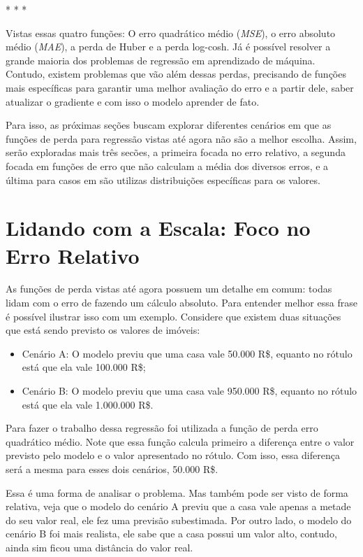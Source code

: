 \medskip
\begin{center}
 * * *
\end{center}
\medskip

Vistas essas quatro funções: O erro quadrático médio (\textit{MSE}), o erro absoluto médio (\textit{MAE}), a perda de Huber e a perda log-cosh. Já é possível resolver a grande maioria dos problemas de regressão em aprendizado de máquina. Contudo, existem problemas que vão além dessas perdas, precisando de funções mais específicas para garantir uma melhor avaliação do erro e a partir dele, saber atualizar o gradiente e com isso o modelo aprender de fato.

Para isso, as próximas seções buscam explorar diferentes cenários em que as funções de perda para regressão vistas até agora não são a melhor escolha. Assim, serão exploradas mais três secões, a primeira focada no erro relativo, a segunda focada em funções de erro que não calculam a média dos diversos erros, e a última para casos em são utilizas distribuições específicas para os valores.

\section{Lidando com a Escala: Foco no Erro Relativo}

As funções de perda vistas até agora possuem um detalhe em comum: todas lidam com o erro de fazendo um cálculo absoluto. Para entender melhor essa frase é possível ilustrar isso com um exemplo. Considere que existem duas situações que está sendo previsto os valores de imóveis:

\begin{itemize}
    \item Cenário A: O modelo previu que uma casa vale 50.000 R\$, equanto no rótulo está que ela vale 100.000 R\$;
    \item Cenário B: O modelo previu que uma casa vale 950.000 R\$, equanto no rótulo está que ela vale 1.000.000 R\$.
\end{itemize}

Para fazer o trabalho dessa regressão foi utilizada a função de perda erro quadrático médio. Note que essa função calcula primeiro a diferença entre o valor previsto pelo modelo e o valor apresentado no rótulo. Com isso, essa diferença será a mesma para esses dois cenários, 50.000 R\$.

Essa é uma forma de analisar o problema. Mas também pode ser visto de forma relativa, veja que o modelo do cenário A previu que a casa vale apenas a metade do seu valor real, ele fez uma previsão subestimada. Por outro lado, o modelo do cenário B foi mais realista, ele sabe que a casa possui um valor alto, contudo, ainda sim ficou uma distância do valor real. 

